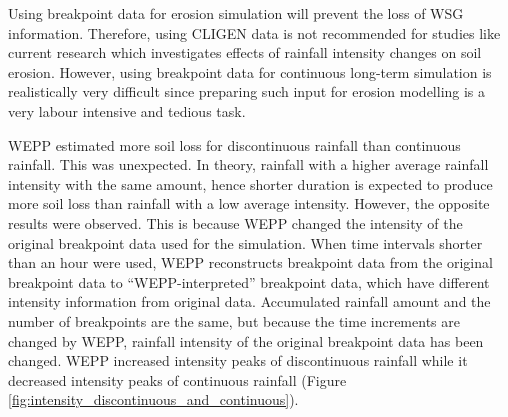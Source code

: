 

Using breakpoint data for erosion simulation will prevent the loss of WSG
information. Therefore, using CLIGEN data is not recommended for studies
like current research which investigates effects of rainfall intensity
changes on soil erosion. However, using breakpoint data for continuous long-term
simulation is realistically very difficult since preparing such input for
erosion modelling is a very labour intensive and tedious task.

WEPP estimated more soil loss for discontinuous rainfall than continuous
rainfall. This was unexpected. In theory, rainfall with a higher average
rainfall intensity with the same amount, hence shorter duration is expected to
produce more soil loss than rainfall with a low average intensity. However, the
opposite results were observed. This is because WEPP changed the intensity of
the original breakpoint data used for the simulation. When time intervals
shorter than an hour were used, WEPP reconstructs breakpoint data from the
original breakpoint data to ``WEPP-interpreted'' breakpoint data, which have
different intensity information from original data. Accumulated rainfall amount
and the number of breakpoints are the same, but because the time increments are
changed by WEPP, rainfall intensity of the original breakpoint data has been
changed. WEPP increased intensity peaks of discontinuous rainfall while it
decreased intensity peaks of continuous rainfall (Figure
\ref{fig:intensity_discontinuous_and_continuous}).


